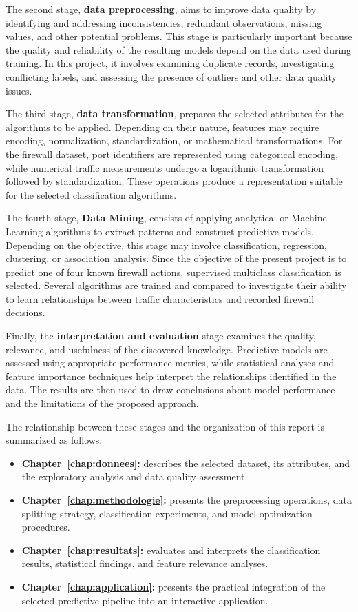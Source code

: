 The second stage, \textbf{data preprocessing}, aims to improve data quality by identifying and addressing inconsistencies, redundant observations, missing values, and other potential problems. This stage is particularly important because the quality and reliability of the resulting models depend on the data used during training. In this project, it involves examining duplicate records, investigating conflicting labels, and assessing the presence of outliers and other data quality issues.

The third stage, \textbf{data transformation}, prepares the selected attributes for the algorithms to be applied. Depending on their nature, features may require encoding, normalization, standardization, or mathematical transformations. For the firewall dataset, port identifiers are represented using categorical encoding, while numerical traffic measurements undergo a logarithmic transformation followed by standardization. These operations produce a representation suitable for the selected classification algorithms.

The fourth stage, \textbf{Data Mining}, consists of applying analytical or Machine Learning algorithms to extract patterns and construct predictive models. Depending on the objective, this stage may involve classification, regression, clustering, or association analysis. Since the objective of the present project is to predict one of four known firewall actions, supervised multiclass classification is selected. Several algorithms are trained and compared to investigate their ability to learn relationships between traffic characteristics and recorded firewall decisions.

Finally, the \textbf{interpretation and evaluation} stage examines the quality, relevance, and usefulness of the discovered knowledge. Predictive models are assessed using appropriate performance metrics, while statistical analyses and feature importance techniques help interpret the relationships identified in the data. The results are then used to draw conclusions about model performance and the limitations of the proposed approach.

The relationship between these stages and the organization of this report is summarized as follows:

\begin{itemize}
    \item \textbf{Chapter~\ref{chap:donnees}:} describes the selected dataset, its attributes, and the exploratory analysis and data quality assessment.
    \item \textbf{Chapter~\ref{chap:methodologie}:} presents the preprocessing operations, data splitting strategy, classification experiments, and model optimization procedures.
    \item \textbf{Chapter~\ref{chap:resultats}:} evaluates and interprets the classification results, statistical findings, and feature relevance analyses.
    \item \textbf{Chapter~\ref{chap:application}:} presents the practical integration of the selected predictive pipeline into an interactive application.
\end{itemize}

